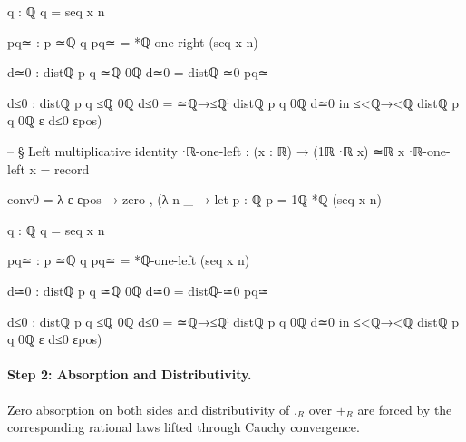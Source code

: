 \documentclass[11pt,a4paper]{book}
\def\cdot{.}%
\def\mathbb#1{#1}%
\begin{document}
\begin{code}
{          q : ℚ
          q = seq x n

          pq≃ : p ≃ℚ q
          pq≃ = *ℚ-one-right (seq x n)

          d≃0 : distℚ p q ≃ℚ 0ℚ
          d≃0 = distℚ-≃0 pq≃

          d≤0 : distℚ p q ≤ℚ 0ℚ
          d≤0 = ≃ℚ→≤ℚˡ {distℚ p q} {0ℚ} d≃0
        in
        ≤<ℚ→<ℚ {distℚ p q} {0ℚ} {ε} d≤0 εpos)
  }

-- § Left multiplicative identity
⋅ℝ-one-left : (x : ℝ) → (1ℝ ⋅ℝ x) ≃ℝ x
⋅ℝ-one-left x = record
  { conv0 = λ ε εpos →
      zero , (λ n _ →
        let
          p : ℚ
          p = 1ℚ *ℚ (seq x n)

          q : ℚ
          q = seq x n

          pq≃ : p ≃ℚ q
          pq≃ = *ℚ-one-left (seq x n)

          d≃0 : distℚ p q ≃ℚ 0ℚ
          d≃0 = distℚ-≃0 pq≃

          d≤0 : distℚ p q ≤ℚ 0ℚ
          d≤0 = ≃ℚ→≤ℚˡ {distℚ p q} {0ℚ} d≃0
        in
        ≤<ℚ→<ℚ {distℚ p q} {0ℚ} {ε} d≤0 εpos)
  }
\end{code}

\paragraph{Step 2: Absorption and Distributivity.}
Zero absorption on both sides and distributivity of
$\cdot_{\mathbb{R}}$ over $+_{\mathbb{R}}$ are forced by
the corresponding rational laws lifted through Cauchy convergence.
\end{document}

